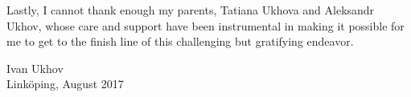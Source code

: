 Lastly, I cannot thank enough my parents, Tatiana Ukhova and Aleksandr Ukhov,
whose care and support have been instrumental in making it possible for me to
get to the finish line of this challenging but gratifying endeavor.

\vspace{4em}
\hfill
\begin{minipage}{0.35\textwidth}
Ivan Ukhov\\
Linköping, August 2017
\end{minipage}


